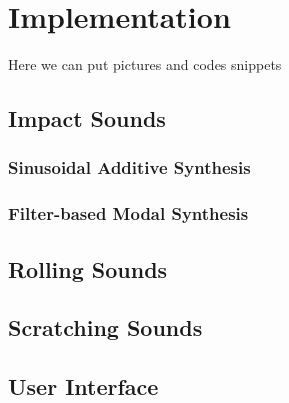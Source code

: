\chapter{Implementation}\label{ch:implementation}
\mbox{}\par
Here we can put pictures and codes snippets


\section{Impact Sounds}
\mbox{}\par

\subsection{Sinusoidal Additive Synthesis}

\subsection{Filter-based Modal Synthesis}

\section{Rolling Sounds}

\section{Scratching Sounds}

\section{User Interface}
